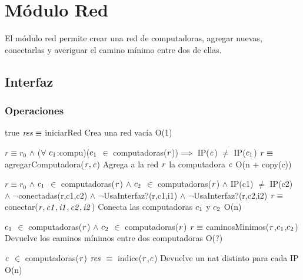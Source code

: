 
\section{Módulo Red}

El módulo red permite crear una red de computadoras, agregar nuevas, conectarlas y averiguar el camino mínimo entre dos de ellas.

\subsection{Interfaz}


\subsubsection*{Operaciones}

 {true}
 {$\text{\textit{res}} \equiv$ iniciarRed}
 {Crea una red vacía}
 {O(1)}

 {$r \equiv r_0$ $\land$ ($\forall$ $\text{\textit{$c_{1}$}}$:compu)($\text{\textit{$c_{1}$}}$ $\in$ computadoras($\text{\textit{r}}$))$\implies$ IP($\text{\textit{c}}$) $\neq$ IP($\text{\textit{$c_{1}$}}$)}
 {$\text{\textit{r}} \equiv$ agregarComputadora($\text{\textit{r}},\text{\textit{c}}$)}
 {Agrega a la red $\text{\textit{r}}$ la computadora $\text{\textit{c}}$}
 {O(n + copy(c))}

 {$r \equiv r_0$ $\land$ $\text{\textit{$c_{1}$}}$ $\in$ computadoras($\text{\textit{r}}$) $\land$ $\text{\textit{$c_{2}$}}$ $\in$ computadoras($\text{\textit{r}}$) $\land$ IP(c1) $\neq$ IP(c2) \\ $\land$ $\neg$conectadas(r,c1,c2) $\land$ $\neg$UsaInterfaz?(r,c1,i1) $\land$ $\neg$UsaInterfaz?(r,c2,i2)}
 {$\text{\textit{r}} \equiv$ conectar($\text{\textit{r}},\text{\textit{c1}},\text{\textit{i1}},\text{\textit{c2}},\text{\textit{i2}}$)}
 {Conecta las computadoras $\text{\textit{$c_{1}$}}$ y $\text{\textit{$c_{2}$}}$}
 {O(n)}

 {$\text{\textit{$c_{1}$}}$ $\in$ computadoras($\text{\textit{r}}$) $\land$ $\text{\textit{$c_{2}$}}$ $\in$ computadoras($\text{\textit{r}}$)}
 {$\text{\textit{r}} \equiv$ caminosMinimos($\text{\textit{r}}$,$\text{\textit{$c_{1}$}}$,$\text{\textit{$c_{2}$}}$)}
 {Devuelve los caminos mínimos entre dos computadoras}
 {O(?)}

 {$\text{\textit{c}}$ $\in$ computadoras($\text{\textit{r}}$)}
 {$\text{\textit{res}}$ $\equiv$ indice($\text{\textit{r}}$,$\text{\textit{c}}$)}
 {Devuelve un nat distinto para cada IP}
 {O(n)}


